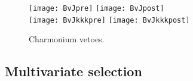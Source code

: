 \begin{figure}
  \begin{center}
    \texttt{[image: BvJpre]}
    \texttt{[image: BvJpost]}\\
    \texttt{[image: BvJkkkpre]}
    \texttt{[image: BvJkkkpost]}
    \caption{\small
      Charmonium vetoes.
    }
    \label{fig:hhh:charmvetoes}
  \end{center}
\end{figure}






\subsection{Multivariate selection}

